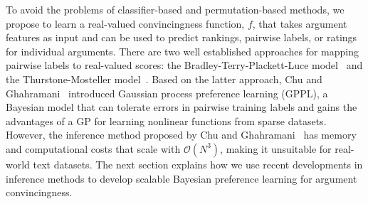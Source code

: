 To avoid the problems of classifier-based and permutation-based methods, 
we propose to learn a real-valued convincingness function, $f$, that takes argument features as input
and can be used to predict rankings, pairwise labels, or ratings for individual arguments.
There are two well established approaches for mapping pairwise labels to real-valued scores: 
the Bradley-Terry-Plackett-Luce model~\cite{bradley1952rank,luce1959possible,plackett1975analysis}
and the Thurstone-Mosteller model~\cite{thurstone1927law,mosteller2006remarks}.
Based on the latter approach, 
Chu and Ghahramani~ introduced 
Gaussian process preference learning (GPPL), 
a Bayesian model that can tolerate errors in pairwise training labels
and gains the advantages of a GP for learning nonlinear functions from sparse datasets.
However, the inference method proposed by Chu and Ghahramani~ 
has memory and computational costs that scale with $\mathcal{O}(N^3)$,
making it unsuitable for real-world text datasets. 
The next section explains how we use recent developments in inference methods 
to develop scalable Bayesian preference learning for argument convincingness.

